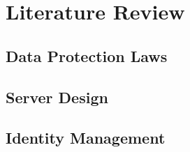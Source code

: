 \chapter{Literature Review}
\label{chapter:literature_review}

\section{Data Protection Laws}
\label{sec:data_protection_laws}

\section{Server Design}
\label{sec:server_design}

\section{Identity Management}
\label{sec:identity_management}
